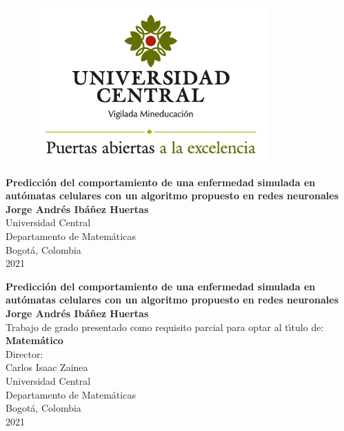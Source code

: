 \begin{center}
\begin{figure}
\centering%
\includegraphics[scale=0.4]{Imagenes/logo_1.png}
\end{figure}
\thispagestyle{empty} \vspace*{2.0cm} \textbf{\huge
Predicción del comportamiento de una enfermedad simulada en autómatas celulares con un algoritmo propuesto en redes neuronales}\\[6.0cm]
\Large\textbf{Jorge Andrés Ibáñez Huertas}\\[4.0cm]
\small Universidad Central\\
Departamento de Matemáticas\\
Bogotá, Colombia\\
2021\\
\end{center}

\newpage{\pagestyle{empty}\cleardoublepage}

\newpage
\begin{center}
\thispagestyle{empty} \vspace*{0cm} \textbf{\huge
Predicción del comportamiento de una enfermedad simulada en autómatas celulares con un algoritmo propuesto en redes neuronales}\\[3.5cm]
\Large\textbf{Jorge Andrés Ibáñez Huertas}\\[3.0cm]
\small Trabajo de grado presentado como requisito parcial para optar al
t\'{\i}tulo de:\\
\textbf{Matemático}\\[3.0cm]
Director:\\
Carlos Isaac Zainea\\[3.5cm]
Universidad Central\\
Departamento de Matemáticas\\
Bogotá, Colombia\\
2021\\
\end{center}

